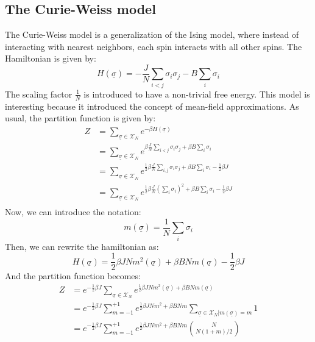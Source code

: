 \subsection{The Curie-Weiss model}
The Curie-Weiss model is a generalization of the Ising model, where instead of interacting with nearest neighbors, each spin interacts with all other spins. The Hamiltonian is given by:
\begin{equation}
    H(\underline{\sigma}) = -\frac{J}{N}\sum_{i<j}\sigma_i\sigma_j - B\sum_i \sigma_i
\end{equation}
The scaling factor $\frac{1}{N}$ is introduced to have a non-trivial free energy. This model is interesting because it introduced the concept of mean-field approximations. As usual, the partition function is given by:
\begin{equation}
    \begin{aligned}
        Z &= \sum_{\underline{\sigma}\in\mathcal{X}_N}e^{-\beta H(\underline{\sigma})}\\
        &= \sum_{\underline{\sigma}\in\mathcal{X}_N}e^{\beta\frac{J}{N}\sum_{i<j}\sigma_i\sigma_j+\beta B \sum_i \sigma_i}\\
        &= \sum_{\underline{\sigma}\in\mathcal{X}_N}e^{\frac{1}{2}\beta\frac{J}{N}\sum_{i,j}\sigma_i\sigma_j+\beta B \sum_i \sigma_i-\frac{1}{2}\beta J}\\
        &= \sum_{\underline{\sigma}\in\mathcal{X}_N}e^{\frac{1}{2}\beta\frac{J}{N}\left(\sum_{i}\sigma_i\right)^2+\beta B \sum_i \sigma_i-\frac{1}{2}\beta J}\\
    \end{aligned}
\end{equation}
Now, we can introduce the notation:
\begin{equation}
m(\underline{\sigma}) = \frac{1}{N}\sum_{i}\sigma_i
\end{equation}
Then, we can rewrite the hamiltonian as:
\begin{equation}
    H(\underline{\sigma}) = \frac{1}{2}\beta J N m^2(\underline{\sigma}) + \beta B N m(\underline{\sigma}) - \frac{1}{2}\beta J
\end{equation}
And the partition function becomes:
\begin{equation}
    \begin{aligned}
        Z &= e^{-\frac{1}{2}\beta J}\sum_{\underline{\sigma}\in\mathcal{X}_N}e^{\frac{1}{2}\beta J N m^2(\underline{\sigma}) + \beta B N m(\underline{\sigma})}\\
        &= e^{-\frac{1}{2}\beta J}\sum_{m=-1}^{+1}e^{\frac{1}{2}\beta J N m^2 + \beta B N m} \sum_{\underline{\sigma}\in\mathcal{X}_N|m(\underline{\sigma})=m} 1\\
        &= e^{-\frac{1}{2}\beta J}\sum_{m=-1}^{+1}e^{\frac{1}{2}\beta J N m^2 + \beta B N m} \binom{N}{N(1+m)/2}\\
    \end{aligned}
\end{equation}

